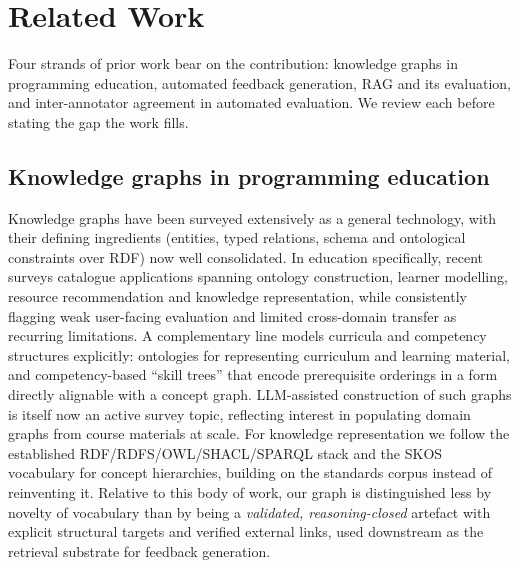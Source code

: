 \documentclass[sageh]{sagej}
\begin{document}
\section{Related Work}
Four strands of prior work bear on the contribution: knowledge graphs in programming education, automated feedback generation, RAG and its evaluation, and inter-annotator agreement in automated evaluation. We review each before stating the gap the work fills.

\subsection{Knowledge graphs in programming education}
Knowledge graphs have been surveyed extensively as a general technology, with their defining ingredients (entities, typed relations, schema and ontological constraints over RDF) now well consolidated.\cite{hogan2021kgsurvey} In education specifically, recent surveys catalogue applications spanning ontology construction, learner modelling, resource recommendation and knowledge representation, while consistently flagging weak user-facing evaluation and limited cross-domain transfer as recurring limitations.\cite{qu2024survey,wu2024personalized} A complementary line models curricula and competency structures explicitly: ontologies for representing curriculum and learning material,\cite{christou2025ontology} and competency-based ``skill trees'' that encode prerequisite orderings in a form directly alignable with a concept graph.\cite{bijl2025skilltrees} LLM-assisted construction of such graphs is itself now an active survey topic, reflecting interest in populating domain graphs from course materials at scale.\cite{bian2025llmkg} For knowledge representation we follow the established RDF/RDFS/OWL/SHACL/SPARQL stack and the SKOS vocabulary for concept hierarchies, building on the standards corpus instead of reinventing it.\cite{w3c-owl2-profiles,w3c-shacl,w3c-skos,w3c-rdf11} Relative to this body of work, our graph is distinguished less by novelty of vocabulary than by being a \emph{validated, reasoning-closed} artefact with explicit structural targets and verified external links, used downstream as the retrieval substrate for feedback generation.
\end{document}
